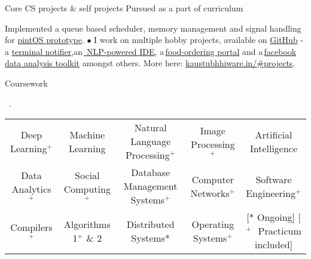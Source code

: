 \documentclass[11pt, a4paper]{resume}
\newcommand{\important}[1]{
	\textcolor{mypurple}{#1}
}
\newcommand{\fillit}[1]{
	\leavevmode\xleaders\hbox{#1}\hfill\kern0pt
}
\newcommand{\sectionSubtitleX}[1]{
	\begin{large}
    \important{#1}
    \end{large}
    \fillit{\important{.}}
}
\begin{document}

\begin{rSubsection}{Core CS projects \& self projects}{\hspace*{\fill} Pursued as a part of curriculum}{}{}
\item Implemented a queue based scheduler, memory management and signal handling for \href{https://github.com/kaustubhhiware/OSLab}{pintOS prototype}.
$\bullet$ I work on multiple hobby projects, available on \href{https://github.com/kaustubhhiware}{GitHub} - a \href{https://github.com/kaustubhhiware/ NotiFyre}{terminal notifier},an\,\href{https://github.com/kaustubhhiware/c0derunR}{ NLP-powered IDE}, a\,\href{https://github.com/kaustubhhiware/Foodspark}{food-ordering portal} and a\,\href{https://github.com/kaustubhhiware/facebook-archive}{facebook data analysis toolkit} amongst others. More here: \href{https://kaustubhhiware.in/#projects}{kaustubhhiware.in/\#projects}.
\end{rSubsection}

\sectionSubtitleX{Coursework} 
\begin{tabular}{>{\footnotesize}c>{\footnotesize}c>{\footnotesize}c>{\footnotesize}c>{\footnotesize}c}
Deep Learning$^+$ & Machine Learning & Natural Language Processing$^+$ & Image Processing$^+$ & Artificial Intelligence \\
Data Analytics$^+$ & Social Computing$^+$ & Database Management Systems$^+$ & Computer Networks$^+$ & Software Engineering$^+$ \\
Compilers$^+$ & Algorithms 1$^+$ \& 2 & Distributed Systems* & Operating Systems$^+$ & {\scriptsize [* Ongoing]\,\,[$^+$ \,\,Practicum included]} \\
\end{tabular}\\
\end{document}

